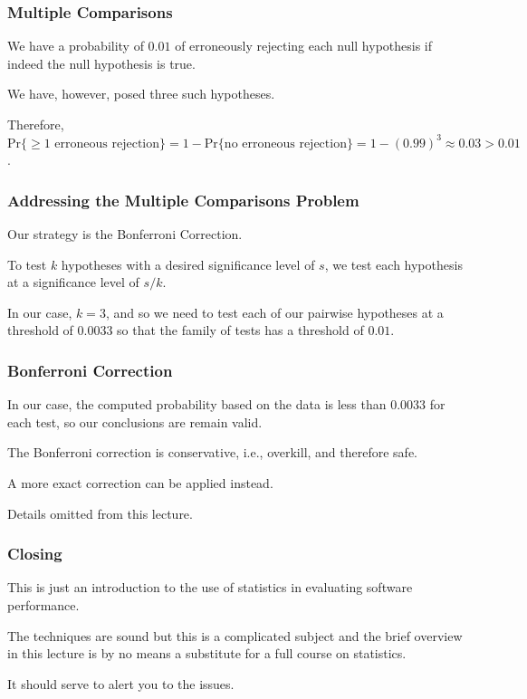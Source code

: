 \begin{frame}
\frametitle{Multiple Comparisons}
\begin{changemargin}{1cm}

We have a probability of
$0.01$ of erroneously rejecting each null hypothesis if indeed
the null hypothesis is true. 

We have, however, posed three
such hypotheses.

Therefore,
$\text{Pr}\{\ge 1 \text{ erroneous rejection}\} =
1 - \text{Pr}\{\text{no erroneous rejection}\} =
1 - (0.99)^3 \approx 0.03 > 0.01$. 

\end{changemargin}
\end{frame}

\begin{frame}
\frametitle{Addressing the Multiple Comparisons Problem}
\begin{changemargin}{1cm}
Our strategy is the Bonferroni Correction.

To test
$k$ hypotheses with a desired significance level of
$s$, we test each hypothesis at a significance level
of $s/k$. 

In our case, $k=3$, and so we need to test
each of our pairwise hypotheses at a threshold of
$0.0033$ so that the family of tests has a threshold
of $0.01$.


\end{changemargin}
\end{frame}


\begin{frame}
\frametitle{Bonferroni Correction}
\begin{changemargin}{1cm}

In our case, the computed probability
based on the data is less than $0.0033$ for each test,
so our conclusions are remain valid.

The Bonferroni correction is conservative, i.e.,
overkill, and therefore safe. 

A more exact
correction can be applied instead.

Details omitted from this lecture.

\end{changemargin}
\end{frame}


\begin{frame}
\frametitle{Closing}
\begin{changemargin}{1cm}

This is just an introduction to the use of statistics in evaluating
software performance.

The techniques are sound but this is a complicated
subject and the brief overview in this lecture is by no means a substitute
for a full course on statistics.

It should serve to alert you to the issues.

\end{changemargin}
\end{frame}




